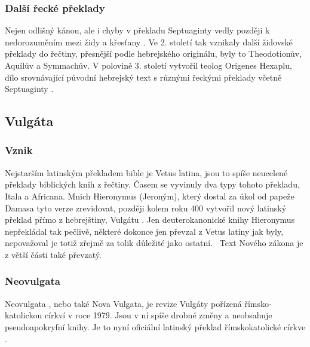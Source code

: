\documentclass[a4rpaper,11pt,oneside]{article}
\begin{document}
\subsubsection{Další řecké překlady}
Nejen odlišný kánon, ale i chyby v překladu Septuaginty  vedly později k nedorozuměním mezi židy  a křesťany . Ve 2. století tak vznikaly další židovské  překlady do řečtiny, přesnější podle hebrejského originálu, byly to Theodotionův, Aquilův a Symmachův. V polovině 3. století vytvořil teolog Origenes Hexaplu, dílo srovnávající původní hebrejský text s různými řeckými překlady včetně Septuaginty  .~\cite[strana 18]{cep}

\subsection{Vulgáta}
\subsubsection{Vznik}
Nejstarším latinským překladem bible je Vetus latina, jsou to spíše neucelené překlady biblických knih z řečtiny. Časem se vyvinuly dva typy tohoto překladu, Itala a Africana. Mnich Hieronymus (Jeroným), který dostal za úkol od papeže Damasa tyto verze zrevidovat, později kolem roku 400 vytvořil nový latinský překlad přímo z hebrejštiny, Vulgátu . Jen deuterokanonické knihy Hieronymus nepřekládal tak pečlivě, některé dokonce jen převzal z Vetus latiny jak byly, nepovažoval je totiž zřejmě za tolik důležité jako ostatní.~\cite[strana 18-19]{cep}  Text Nového zákona je z větší části také převzatý.

\subsubsection{Neovulgata}
Neovulgata , nebo také Nova Vulgata, je revize Vulgáty pořízená římsko-katolickou církví  v roce 1979. Jsou v ní spíše drobné změny a neobsahuje pseudoapokryfní knihy. Je to nyní oficiální latinský překlad římskokatolické církve .~\cite[strana 19]{cep}
\end{document}
